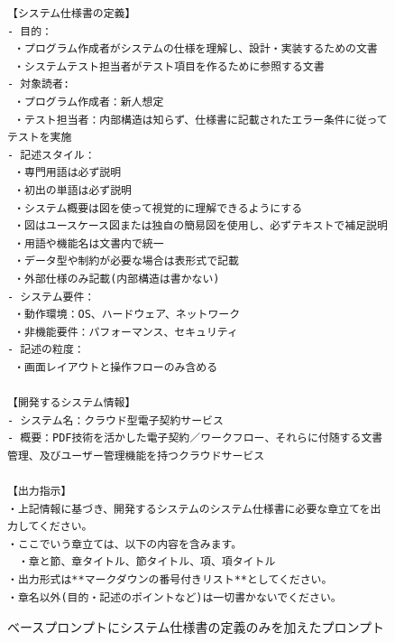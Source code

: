 \begin{figure}[tp]
\begin{tcolorbox}[
  colback=white,
  colframe=blue,
  fonttitle=\bfseries
]
\footnotesize
\ttfamily
\fontsize{8}{9}\selectfont
\begin{verbatim}
【システム仕様書の定義】
- 目的：
 ・プログラム作成者がシステムの仕様を理解し、設計・実装するための文書 
 ・システムテスト担当者がテスト項目を作るために参照する文書
- 対象読者:
 ・プログラム作成者：新人想定 
 ・テスト担当者：内部構造は知らず、仕様書に記載されたエラー条件に従ってテストを実施
- 記述スタイル：
 ・専門用語は必ず説明 
 ・初出の単語は必ず説明 
 ・システム概要は図を使って視覚的に理解できるようにする 
 ・図はユースケース図または独自の簡易図を使用し、必ずテキストで補足説明 
 ・用語や機能名は文書内で統一 
 ・データ型や制約が必要な場合は表形式で記載 
 ・外部仕様のみ記載(内部構造は書かない)
- システム要件：
 ・動作環境：OS、ハードウェア、ネットワーク 
 ・非機能要件：パフォーマンス、セキュリティ 
- 記述の粒度：
 ・画面レイアウトと操作フローのみ含める

【開発するシステム情報】
- システム名：クラウド型電子契約サービス
- 概要：PDF技術を活かした電子契約／ワークフロー、それらに付随する文書管理、及びユーザー管理機能を持つクラウドサービス

【出力指示】
・上記情報に基づき、開発するシステムのシステム仕様書に必要な章立てを出力してください。
・ここでいう章立ては、以下の内容を含みます。
　・章と節、章タイトル、節タイトル、項、項タイトル 
・出力形式は**マークダウンの番号付きリスト**としてください。 
・章名以外(目的・記述のポイントなど)は一切書かないでください。
\end{verbatim}
\end{tcolorbox}
\caption{ベースプロンプトにシステム仕様書の定義のみを加えたプロンプト}
\label{fig:only_definition}
\end{figure}


